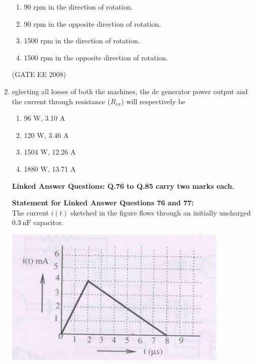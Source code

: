 \documentclass[journal,12pt,onecolumn]{IEEEtran}
\theoremstyle{remark}
\begin{document}
\begin{enumerate}[start=1, label=Q.\arabic*]
\begin{enumerate}
    \item 90 rpm in the direction of rotation.
    \item 90 rpm in the opposite direction of rotation.
    \item 1500 rpm in the direction of rotation.
    \item 1500 rpm in the opposite direction of rotation.
\end{enumerate}

\hfill (GATE EE 2008) \\[5mm]

\item eglecting all losses of both the machines, the dc generator power output and the current through resistance ($R_{ex}$) will respectively be
\begin{multicols}{2}
\begin{enumerate}
    \item 96 W, 3.10 A
    \item 120 W, 3.46 A
    \item 1504 W, 12.26 A
    \item 1880 W, 13.71 A
\end{enumerate}
\end{multicols}


\begin{center}
\textbf{Linked Answer Questions: Q.76 to Q.85 carry two marks each.}
\end{center}

\textbf{Statement for Linked Answer Questions 76 and 77:}\\

The current $i(t)$ sketched in the figure flows through an initially uncharged $0.3~\text{nF}$ capacitor.

\begin{center}
\includegraphics[width=\columnwidth]{Fig/comp3.png}
\caption{}
\end{center}


\end{enumerate}
\end{document}
